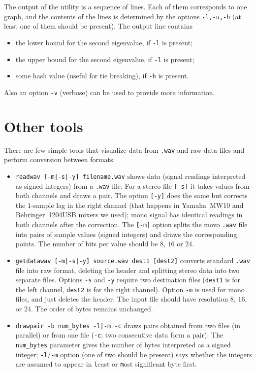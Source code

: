 \documentclass[12pt,a4paper,fullpage]{article}
\begin{document}
The output of the utility is a sequence of lines. Each of them corresponds to one graph, and the contents of the lines is determined by the options \texttt{-l,-u,-h} (at least one of them should be present). The output line contains
\begin{itemize}
\item the lower bound for the second eigenvalue, if \texttt{-l} is present;
\item the upper bound for the second eigenvalue, if \texttt{-l} is present;
\item some hash value (useful for tie breaking), if \texttt{-h} is present.
\end{itemize}
Also an option \texttt{-v} (verbose) can be used to provide more information.

\section{Other tools}\label{sec:graphic}

There are few simple tools that visualize data from \texttt{.wav} and raw data files and perform conversion between formats.

\begin{itemize}
\item \texttt{readwav [-m|-s|-y] filename.wav} shows data (signal readings interpreted as signed integers) from a \texttt{.wav} file. For a stereo file \texttt{[-s]} it takes values from both channels and draws a pair. The option \texttt{[-y]} does the same but corrects the $1$-sample lag in the right channel (that happens in Yamaha~MW10 and Behringer~1204USB mixers we used); mono signal has identical readings in both channels after the correction. The \texttt{[-m]} option splits the movo \texttt{.wav} file into pairs of sample values (signed integers) and draws the corresponding points. The number of bits per value should be $8$, $16$ or $24$.

\item \texttt{getdatawav [-m|-s|-y] source.wav dest1 [dest2]} converts standard \texttt{.wav} file into raw format, deleting the header and splitting stereo data into two separate files. Options \texttt{-s} and \texttt{-y} require two destination files (\texttt{dest1} is for the left channel, \texttt{dest2} is for the right channel). Option \texttt{-m} is used for mono files, and just deletes the header. The input file should have resolution $8$, $16$, or $24$. The order of bytes remains unchanged.

\item \texttt{drawpair -b num\_bytes -l|-m -c} draws pairs obtained from two files (in parallel) or from one file (\texttt{-c}; two consecutive data form a pair). The \texttt{num\_bytes} parameter gives the number of bytes interpreted as a signed integer; \texttt{-l}/\texttt{-m} option (one of two should be present) says whether the integers are assumed to appear in \texttt{l}east or \texttt{m}ost significant byte first.

\end{itemize}
\end{document}
